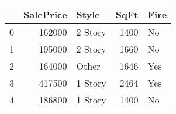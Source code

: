 \begin{tabular}{lrlrl}
\toprule
{} &  SalePrice &    Style &  SqFt & Fire \\
\midrule
0 &     162000 &  2 Story &  1400 &   No \\
1 &     195000 &  2 Story &  1660 &   No \\
2 &     164000 &    Other &  1646 &  Yes \\
3 &     417500 &  1 Story &  2464 &  Yes \\
4 &     186800 &  1 Story &  1400 &   No \\
\bottomrule
\end{tabular}
